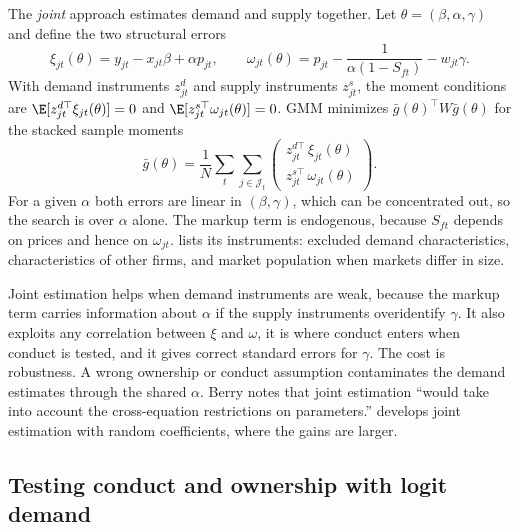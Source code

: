 The \emph{joint} approach estimates demand and supply together. Let $\theta = (\beta, \alpha, \gamma)$ and define the
two structural errors
\begin{equation}\label{eq:07-joint-errors}
  \xi_{jt}(\theta) = y_{jt} - x_{jt}\beta + \alpha p_{jt}, \qquad
  \omega_{jt}(\theta) = p_{jt} - \frac{1}{\alpha(1 - S_{ft})} - w_{jt}\gamma .
\end{equation}
With demand instruments $z^d_{jt}$ and supply instruments $z^s_{jt}$, the moment conditions are $\E[z^{d\top}_{jt}
\xi_{jt}(\theta)] = 0$ and $\E[z^{s\top}_{jt}\omega_{jt}(\theta)] = 0$. GMM minimizes $\bar g(\theta)^\top W \bar
g(\theta)$ for the stacked sample moments
\begin{equation}\label{eq:07-joint-gmm}
  \bar g(\theta) = \frac{1}{N}\sum_t\sum_{j \in \mathcal{J}_t}
  \begin{pmatrix} z^{d\top}_{jt}\,\xi_{jt}(\theta) \\ z^{s\top}_{jt}\,\omega_{jt}(\theta) \end{pmatrix} .
\end{equation}
For a given $\alpha$ both errors are linear in $(\beta, \gamma)$, which can be concentrated out, so the search is over
$\alpha$ alone. The markup term is endogenous, because $S_{ft}$ depends on prices and hence on $\omega_{jt}$.
\citet[p.~255]{Berry1994} lists its instruments: excluded demand characteristics, characteristics of other firms, and
market population when markets differ in size.

Joint estimation helps when demand instruments are weak, because the markup term carries information about $\alpha$
if the supply instruments overidentify $\gamma$. It also exploits any correlation between $\xi$ and $\omega$, it is
where conduct enters when conduct is tested, and it gives correct standard errors for $\gamma$. The cost is
robustness. A wrong ownership or conduct assumption contaminates the demand estimates through the shared $\alpha$.
Berry notes that joint estimation ``would take into account the cross-equation restrictions on parameters.''
 develops joint estimation with random coefficients, where the gains are larger.

\subsection{Testing conduct and ownership with logit demand}\label{sec:07-conduct}

